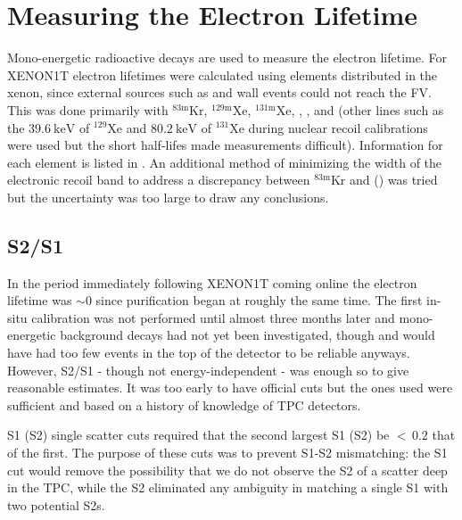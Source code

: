 \section{Measuring the Electron Lifetime}
\label{sec:electron_lifetime_measurements}
Mono-energetic radioactive decays are used to measure the electron lifetime.  For XENON1T electron lifetimes were calculated
using elements distributed in the xenon, since external \gammaray sources such as  and
wall events could not reach the FV.  This was done primarily with $\mathrm{^{83m}Kr}$, $\mathrm{^{129m}Xe}$, $\mathrm{^{131m}Xe}$,
, , and  (other lines such as the $39.6\ \mathrm{keV}$ of $\mathrm{^{129}Xe}$ and
$80.2\ \mathrm{keV}$ of $\mathrm{^{131}Xe}$ during nuclear recoil calibrations were used but the short half-lifes made measurements
difficult).  Information for each element is listed in .  An
additional method of minimizing the \stwob width of the
 electronic recoil band to address a discrepancy between
$\mathrm{^{83m}Kr}$ and \alphadecays () was tried but the uncertainty was too large to
draw any conclusions.



\subsection{S2/S1}
\label{subsec:electron_lifetimes_measurement_ss}
In the period immediately following XENON1T coming online the electron lifetime was ${\sim} 0$ since purification began at roughly
the same time.  The first in-situ calibration was not performed until almost three months later and mono-energetic
background decays had not yet been investigated, though  and  would have had too few events in the top of the
detector to be reliable anyways.  However,
S2/S1 - though not energy-independent - was enough so to give reasonable estimates.  It was too early to have official cuts but
the ones used were sufficient and based on a history of knowledge of TPC detectors.

S1 (S2) single scatter cuts required that the second largest S1 (S2) be ${<}\, 0.2$ that of the first.  The purpose of these cuts was to
prevent S1-S2 mismatching: the S1 cut would
remove the possibility that we do not observe the S2 of a scatter deep in the TPC, while the S2 eliminated any ambiguity in matching a
single S1 with two potential S2s.

